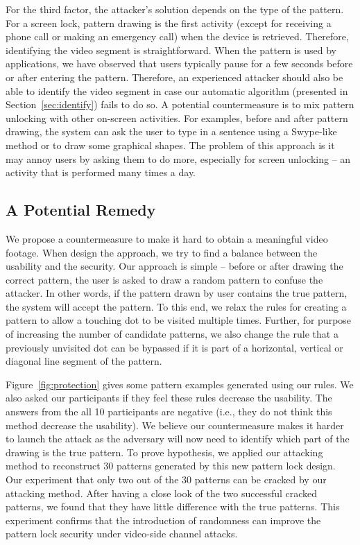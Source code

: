 For the third factor, the attacker's solution depends on the type of the
pattern. For a screen lock, pattern drawing is the first activity (except for
receiving a phone call or making an emergency call) when the device is
retrieved. Therefore, identifying the video segment is straightforward. When
the pattern is used by applications, we have observed that users typically
pause for a few seconds before or after entering the pattern. Therefore, an
experienced attacker should also be able to identify the video segment in
case our automatic algorithm (presented in Section~\ref{sec:identify}) fails
to do so. A potential countermeasure is to mix pattern unlocking with other
on-screen activities. For examples, before and after pattern drawing, the
system can ask the user to type in a sentence using a Swype-like method or to
draw some graphical shapes. The problem of this approach is it may annoy
users by asking them to do more, especially for screen unlocking -- an
activity that is performed
many times a day.


\subsection{A Potential Remedy}
\label{section: potential-remedy}
We propose a countermeasure to make it hard to obtain a meaningful video footage.
When design the approach, we try to find a balance between the usability and the security.
Our approach is simple --
before or after drawing the correct pattern, the user is asked to draw a random pattern to confuse the attacker. In
other words, if the pattern drawn by user contains the true pattern, the system will accept the pattern. To this
end, we relax the rules for creating a pattern to allow a touching dot to be visited multiple times. Further, for
purpose of increasing the number of candidate patterns, we also change the rule that a previously unvisited dot can be
bypassed if it is part of a horizontal, vertical or diagonal line segment of the pattern.


Figure~\ref{fig:protection} gives some pattern examples generated using our rules. We also asked our participants if they feel these rules decrease
the usability. The answers from the all 10 participants are negative (i.e., they do not think this method decrease the usability).
We believe our countermeasure makes it harder to launch the attack as the adversary will now need to
identify which part of the drawing is the true pattern.
To prove hypothesis, we applied our attacking method to reconstruct 30 patterns generated by this new pattern lock design.
Our experiment  that only two out of the 30 patterns can be cracked by our attacking method.
After having a close look of the two successful cracked patterns, we found that they have little difference with the true patterns.
This experiment confirms that the introduction of randomness can improve the pattern lock security under video-side channel attacks.

